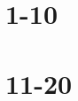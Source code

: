 \documentclass[a4]{scrartcl}
\begin{document}
      \section{1-10}
      \lipsum[1-10]
      \section{11-20}
      \lipsum[11-20]
    
\end{document}

